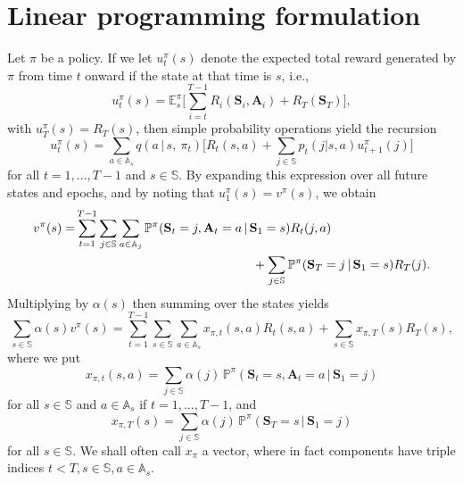 \documentclass{article}
\theoremstyle{definition}
\numberwithin{equation}{section}
\begin{document}
{\section{Linear programming formulation}
\label{sect_LP}
Let $\pi$ be a policy. %
If we let $u_t^{\pi}(s)$ denote the expected total reward generated by $\pi$ from time $t$ onward if the state at that time is $s$, i.e., \begin{equation*}u_t^{\pi}(s) = \mathbb{E}_{s}^{\pi}\biggl[\sum_{i = t}^{T-1}R_i(\textbf{S}_i, \textbf{A}_i) + R_T(\textbf{S}_T)\biggr],\end{equation*} with $u_T^{\pi}(s) = R_T(s)$, then simple probability operations yield the recursion \begin{equation*}u_t^{\pi}(s) = \sum_{a \in \mathbb{A}_s}q(a \,|\, s,\ \pi_t)\biggl[R_t(s, a) + \sum_{j \in \mathbb{S}}p_t(j | s, a)u_{t+1}^{\pi}(j)\biggr]\end{equation*} for all $t = 1, ..., T-1$ and $s \in \mathbb{S}$. By expanding this expression over all future states and epochs, and by noting that $u_1^{\pi}(s) = v^{\pi}(s)$, we obtain
\begin{align}
\label{value}
\begin{split}
v^{\pi}(s) = &\sum_{t = 1}^{T-1}\sum_{j \in \mathbb{S}}\sum_{a \in \mathbb{A}_j} \mathbb{P}^{\pi}(\textbf{S}_t = j, \textbf{A}_t = a \,|\, \textbf{S}_1 = s)R_t(j, a) 
\hspace*{1cm}\\& \hspace*{5cm}+ \sum_{j \in \mathbb{S}}\mathbb{P}^{\pi}(\textbf{S}_T = j\,|\, \textbf{S}_1 = s)R_T(j).
\end{split}
\end{align}
%
Multiplying by $\alpha(s)$ then summing over the states yields
\begin{equation}\label{eq1}\sum_{s \in \mathbb{S}}\alpha(s)v^{\pi}(s) = \sum_{t = 1}^{T-1}\sum_{s \in \mathbb{S}}\sum_{a \in \mathbb{A}_s} x_{\pi, t}(s, a)R_t(s, a) + \sum_{s \in \mathbb{S}}x_{\pi, T}(s)R_T(s),\end{equation}
where we put
\begin{equation}\label{eq2}x_{\pi, t}(s, a) = \sum_{j \in \mathbb{S}}\alpha(j)\,\mathbb{P}^{\pi}(\textbf{S}_t = s, \textbf{A}_t = a \,|\, \textbf{S}_1 = j)\end{equation} for all $s \in \mathbb{S}$ and $a \in \mathbb{A}_s$ if $t = 1, ..., T-1$, and \begin{equation}\label{eq3}x_{\pi, T}(s) = \sum_{j \in \mathbb{S}}\alpha(j)\,\mathbb{P}^{\pi}(\textbf{S}_T = s \,|\, \textbf{S}_1 = j)\end{equation} for all $s \in \mathbb{S}$.
We shall often call $x_\pi$ a vector, where in fact components have triple indices
$t<T, s\in \mathbb S, a \in \mathbb{A}_s$.

}
\end{document}
